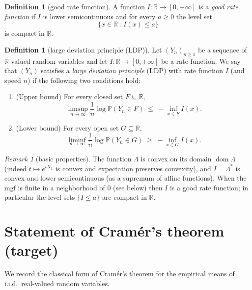 \documentclass[12pt]{article}
\theoremstyle{definition}
\newtheorem{definition}[theorem]{Definition}
\theoremstyle{remark}
\newtheorem*{remark}{Remark}
\begin{document}
\begin{definition}[good rate function]
A function $I:\mathbb{R}\to[0,+\infty]$ is a \emph{good rate function} if $I$ is lower semicontinuous and for every $a\ge 0$ the level set
\[
\{x\in\mathbb{R}\,:\, I(x)\le a\}
\]
is compact in $\mathbb{R}$.
\end{definition}

\begin{definition}[large deviation principle (LDP)]
Let $(Y_n)_{n\ge1}$ be a sequence of $\mathbb{R}$-valued random variables and let $I:\mathbb{R}\to[0,+\infty]$ be a rate function.  We say that $(Y_n)$ satisfies a \emph{large deviation principle} (LDP) with rate function $I$ (and speed $n$) if the following two conditions hold:
\begin{enumerate}
\item (Upper bound) For every closed set $F\subseteq\mathbb{R}$,
\[
\limsup_{n\to\infty}\frac{1}{n}\log \mathbb{P}(Y_n\in F)
\;\le\; -\inf_{x\in F} I(x).
\]
\item (Lower bound) For every open set $G\subseteq\mathbb{R}$,
\[
\liminf_{n\to\infty}\frac{1}{n}\log \mathbb{P}(Y_n\in G)
\;\ge\; -\inf_{x\in G} I(x).
\]
\end{enumerate}
\end{definition}

\begin{remark}[basic properties]
The function $\Lambda$ is convex on its domain $\operatorname{dom}\Lambda$ (indeed $t\mapsto e^{tX_1}$ is convex and expectation preserves convexity), and $I=\Lambda^*$ is convex and lower semicontinuous (as a supremum of affine functions).  When the mgf is finite in a neighborhood of $0$ (see below) then $I$ is a good rate function; in particular the level sets $\{I\le a\}$ are compact in $\mathbb{R}$.
\end{remark}

\section{Statement of Cramér's theorem (target)}

We record the classical form of Cramér's theorem for the empirical means of i.i.d.\ real-valued random variables.
\end{document}
